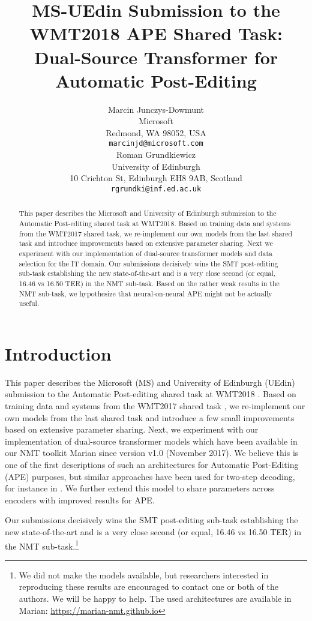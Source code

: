 \documentclass[11pt,a4paper]{article}
\title{MS-UEdin Submission to the WMT2018 APE Shared Task: \\Dual-Source Transformer for Automatic Post-Editing}
\author{Marcin Junczys-Dowmunt \\
  Microsoft \\
  Redmond, WA 98052, USA \\
  {\tt marcinjd@microsoft.com} \\\And
  Roman Grundkiewicz \\
  University of Edinburgh \\
  10 Crichton St, Edinburgh EH8 9AB, Scotland \\
  {\tt rgrundki@inf.ed.ac.uk} \\}
\date{}
\begin{document}
\maketitle
\begin{abstract}

This paper describes the Microsoft and University of Edinburgh submission to the Automatic Post-editing shared task at WMT2018. Based on training data and systems from the WMT2017 shared task, we re-implement our own models from the last shared task and introduce improvements based on extensive parameter sharing. 
Next we experiment with our implementation of dual-source transformer models and data selection for the IT domain.
Our submissions decisively wins the SMT post-editing sub-task establishing the new state-of-the-art and is a very close second (or equal, 16.46 vs 16.50 TER) in the NMT sub-task.
Based on the rather weak results in the NMT sub-task, we hypothesize that neural-on-neural APE might not be actually useful.
\end{abstract}

\section{Introduction}

This paper describes the Microsoft (MS) and University of Edinburgh (UEdin) submission to the Automatic Post-editing shared task at WMT2018 \cite{chatterjee-EtAl:2018:WMTAPE}. Based on training data and systems from the WMT2017 shared task \cite{bojar-EtAl:2017:WMT1}, we re-implement our own models from the last shared task \cite{junczysdowmunt-grundkiewicz:2017:WMT,I17-1013} and introduce a few small improvements based on extensive parameter sharing. 
Next, we experiment with our implementation of dual-source transformer models which have been available in our NMT toolkit Marian \cite{marian} since version v1.0 (November 2017). We believe this is one of the first descriptions of such an architectures for Automatic Post-Editing (APE) purposes, but similar approaches have been used for two-step decoding, for instance in .
We further extend this model to share parameters across encoders with improved results for APE. 

Our submissions decisively wins the SMT post-editing sub-task  establishing the new state-of-the-art and is a very close second (or equal, 16.46 vs 16.50 TER) in the NMT sub-task.\footnote{We did not make the models available, but researchers interested in reproducing these results are encouraged to contact one or both of the authors. We will be happy to help. The used architectures are available in Marian: \url{https://marian-nmt.github.io}}
\end{document}
